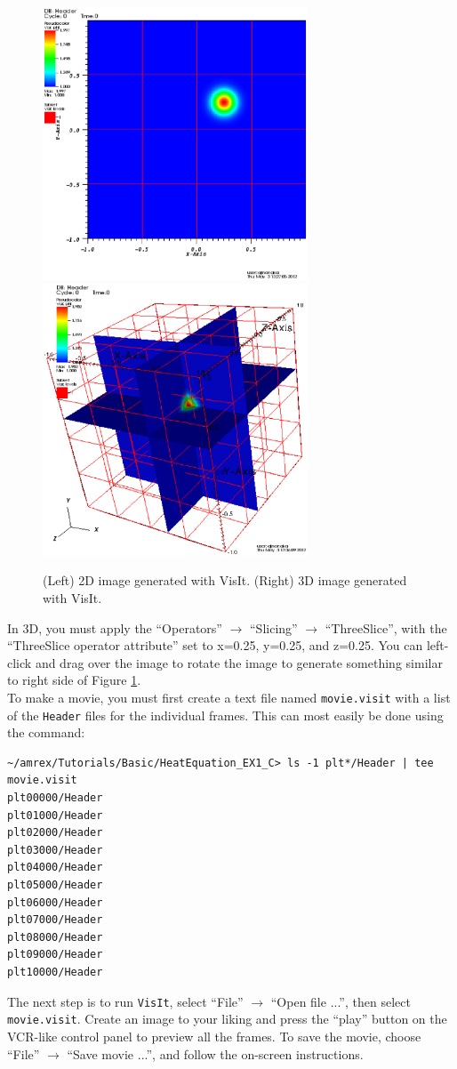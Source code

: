 \begin{figure}[tb]
\centering
\includegraphics[width=3.1in]{./Visualization/VisIt_2D}
\includegraphics[width=3.1in]{./Visualization/VisIt_3D}
\caption{(Left) 2D image generated with VisIt.  (Right) 3D image generated with VisIt.}
\label{Fig:VisIt}
\end{figure}

In 3D, you must apply the ``Operators'' $\rightarrow$ ``Slicing'' $\rightarrow$ ``ThreeSlice'', with the 
``ThreeSlice operator attribute'' set to x=0.25, y=0.25, and z=0.25.  You can left-click and drag
over the image to rotate the image to generate something similar to right side of Figure \ref{Fig:VisIt}.\\

To make a movie, you must first create a text file named {\tt movie.visit} with a list of the {\tt Header} 
files for the individual frames.  This can most easily be done using the command:
\begin{lstlisting}[backgroundcolor=\color{light-red}]
~/amrex/Tutorials/Basic/HeatEquation_EX1_C> ls -1 plt*/Header | tee movie.visit
plt00000/Header
plt01000/Header
plt02000/Header
plt03000/Header
plt04000/Header
plt05000/Header
plt06000/Header
plt07000/Header
plt08000/Header
plt09000/Header
plt10000/Header
\end{lstlisting}
The next step is to run {\tt VisIt}, select ``File'' $\rightarrow$ ``Open file ...'',
then select {\tt movie.visit}.  Create an image to your liking and press the ``play'' button
on the VCR-like control panel to preview all the frames.  To save the movie, choose
``File'' $\rightarrow$ ``Save movie ...'', and follow the on-screen instructions.

